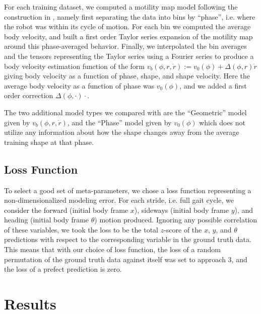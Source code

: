 \documentclass[conference]{IEEEtran}
\begin{document}
For each training dataset, we computed a motility map model following the construction in , namely first separating the data into bins by ``phase'', i.e. where the robot was within its cycle of motion.
For each bin we computed the average body velocity, and built a first order Taylor series expansion of the motility map around this phase-averaged behavior.
Finally, we interpolated the bin averages and the tensors representing the Taylor series using a Fourier series to produce a body velocity estimation function of the form $v_b(\phi,r,\dot r) := v_0(\phi) + \Delta(\phi,r) \dot r$ giving body velocity as a function of phase, shape, and shape velocity.
Here the average body velocity as a function of phase was $v_0(\phi)$, and we added a first order correction $\Delta(\phi,\cdot)\cdot$.

The two additional model types we compared with are the ``Geometric'' model given by $v_b(\phi,r,\dot r)$, and the ``Phase'' model given by $v_0(\phi)$ which does not utilize any information about how the shape changes away from the average training shape at that phase.

\subsection{Loss Function}

To select a good set of meta-parameters, we chose a loss function representing a non-dimensionalized modeling error.
For each stride, i.e. full gait cycle, we consider the forward (initial body frame $x$), sideways (initial body frame $y$), and heading (initial body frame $\theta$) motion produced.
Ignoring any possible correlation of these variables, we took the loss to be the total $z$-score of the $x$, $y$, and $\theta$ predictions with respect to the corresponding variable in the ground truth data.
This means that with our choice of loss function, the loss of a random permutation of the ground truth data against itself was set to approach $3$, and the loss of a prefect prediction is zero.
\section{Results}
\end{document}
